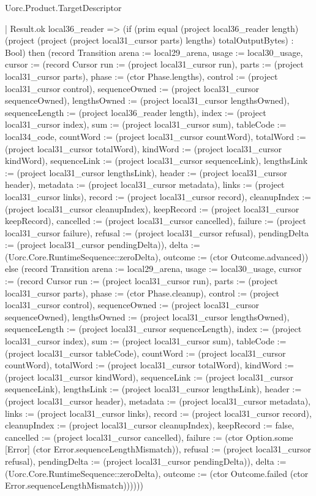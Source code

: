 \begin{lexlean}{Uorc.Product.TargetDescriptor}
\begin{semanticmodule}
{        | Result.ok local36_reader => (if (prim equal (project local36_reader length) (project (project (project local31_cursor parts) lengths) totalOutputBytes) : Bool) then (record Transition {arena := local29_arena, usage := local30_usage, cursor := (record Cursor {run := (project local31_cursor run), parts := (project local31_cursor parts), phase := (ctor Phase.lengths), control := (project local31_cursor control), sequenceOwned := (project local31_cursor sequenceOwned), lengthsOwned := (project local31_cursor lengthsOwned), sequenceLength := (project local36_reader length), index := (project local31_cursor index), sum := (project local31_cursor sum), tableCode := local34_code, countWord := (project local31_cursor countWord), totalWord := (project local31_cursor totalWord), kindWord := (project local31_cursor kindWord), sequenceLink := (project local31_cursor sequenceLink), lengthsLink := (project local31_cursor lengthsLink), header := (project local31_cursor header), metadata := (project local31_cursor metadata), links := (project local31_cursor links), record := (project local31_cursor record), cleanupIndex := (project local31_cursor cleanupIndex), keepRecord := (project local31_cursor keepRecord), cancelled := (project local31_cursor cancelled), failure := (project local31_cursor failure), refusal := (project local31_cursor refusal), pendingDelta := (project local31_cursor pendingDelta)}), delta := (Uorc.Core.RuntimeSequence::zeroDelta), outcome := (ctor Outcome.advanced)}) else (record Transition {arena := local29_arena, usage := local30_usage, cursor := (record Cursor {run := (project local31_cursor run), parts := (project local31_cursor parts), phase := (ctor Phase.cleanup), control := (project local31_cursor control), sequenceOwned := (project local31_cursor sequenceOwned), lengthsOwned := (project local31_cursor lengthsOwned), sequenceLength := (project local31_cursor sequenceLength), index := (project local31_cursor index), sum := (project local31_cursor sum), tableCode := (project local31_cursor tableCode), countWord := (project local31_cursor countWord), totalWord := (project local31_cursor totalWord), kindWord := (project local31_cursor kindWord), sequenceLink := (project local31_cursor sequenceLink), lengthsLink := (project local31_cursor lengthsLink), header := (project local31_cursor header), metadata := (project local31_cursor metadata), links := (project local31_cursor links), record := (project local31_cursor record), cleanupIndex := (project local31_cursor cleanupIndex), keepRecord := false, cancelled := (project local31_cursor cancelled), failure := (ctor Option.some [Error] (ctor Error.sequenceLengthMismatch)), refusal := (project local31_cursor refusal), pendingDelta := (project local31_cursor pendingDelta)}), delta := (Uorc.Core.RuntimeSequence::zeroDelta), outcome := (ctor Outcome.failed (ctor Error.sequenceLengthMismatch))}))))
}
\end{semanticmodule}
\end{lexlean}
